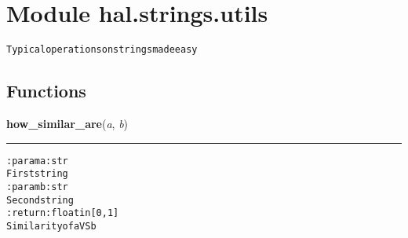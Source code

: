 %
%
%


\section{Module hal.strings.utils}

    \label{hal:strings:utils}
\begin{alltt}
Typical operations on strings made easy 
\end{alltt}



  \subsection{Functions}

    \label{hal:strings:utils:how_similar_are}

    \vspace{0.5ex}

\hspace{.8\funcindent}\begin{boxedminipage}{\funcwidth}

    \raggedright \textbf{how\_similar\_are}(\textit{a}, \textit{b})

    \vspace{-1.5ex}

    \rule{\textwidth}{0.5\fboxrule}
\setlength{\parskip}{2ex}
\begin{alltt}

:param a: str
    First string
:param b: str
    Second string
:return: float in [0, 1]
    Similarity of a VS b
\end{alltt}

\setlength{\parskip}{1ex}
    \end{boxedminipage}

